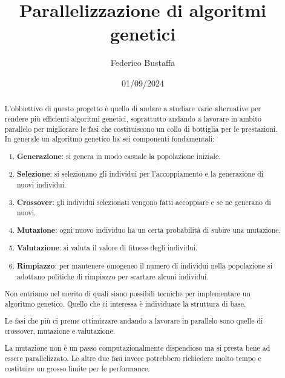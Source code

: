\documentclass[12pt]{article}
\title{Parallelizzazione di algoritmi genetici}
\author{Federico Bustaffa}
\date{01/09/2024}
\begin{document}
\maketitle

\begin{abstract}
	L'obbiettivo di questo progetto è quello di andare a studiare varie alternative
	per rendere più efficienti algoritmi genetici, soprattutto andando a lavorare
	in ambito parallelo per migliorare le fasi che costituiscono un collo di
	bottiglia per le prestazioni. In generale un algoritmo genetico ha sei
	componenti fondamentali:
	\begin{enumerate}
		\item \textbf{Generazione}: si genera in modo casuale la popolazione
		      iniziale.
		\item \textbf{Selezione}: si selezionano gli individui per l'accoppiamento
		      e la generazione di nuovi individui.
		\item \textbf{Crossover}: gli individui selezionati vengono fatti
		      accoppiare e se ne generano di nuovi.
		\item \textbf{Mutazione}: ogni nuovo individuo ha un certa probabilità di
		      subire una mutazione.
		\item \textbf{Valutazione}: si valuta il valore di fitness degli individui.
		\item \textbf{Rimpiazzo}: per mantenere omogeneo il numero di individui
		      nella popolazione si adottano politiche di rimpiazzo per scartare
		      alcuni individui.
	\end{enumerate}
	Non entriamo nel merito di quali siano possibili tecniche per implementare un
	algoritmo genetico. Quello che ci interessa è individuare la struttura di base.

	Le fasi che più ci preme ottimizzare andando a lavorare in parallelo sono
	quelle di crossover, mutazione e valutazione.

	La mutazione non è un passo computazionalmente dispendioso ma si presta bene ad
	essere parallelizzato. Le altre due fasi invece potrebbero richiedere molto
	tempo e costituire un grosso limite per le performance.
\end{abstract}

\tableofcontents



\end{document}

